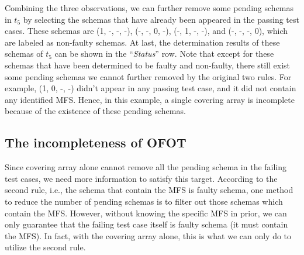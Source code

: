 Combining the three observations, we can further remove some pending schemas in $t_{5}$ by selecting the schemas that have already been appeared in the passing test cases. These schemas are (1, -, -, -), (-, -, 0, -), (-, 1, -, -), and (-, -, -, 0), which are labeled as non-faulty schemas. At last, the determination results of these schemas of $t_{5}$ can be shown in the ``\emph{Status}'' row. Note that except for these schemas that have been determined to be faulty and non-faulty, there still exist some pending schemas we cannot further removed by the original two rules. For example, (1, 0, -, -) didn't appear in any passing test case, and it did not contain any identified MFS. Hence, in this example, a single covering array is incomplete because of the existence of these pending schemas.

%
%
%


\subsection{The incompleteness of OFOT}
Since covering array alone cannot remove all the pending schema in the failing test cases, we need more information to satisfy this target.  According to the second rule, i.e., the schema that contain the MFS is faulty schema, one method to reduce the number of pending schemas is to filter out those schemas which contain the MFS. However, without knowing the specific MFS in prior, we can only guarantee that the failing test case itself is faulty schema (it must contain the MFS). In fact, with the covering array alone, this is what we can only do to utilize the second rule.

